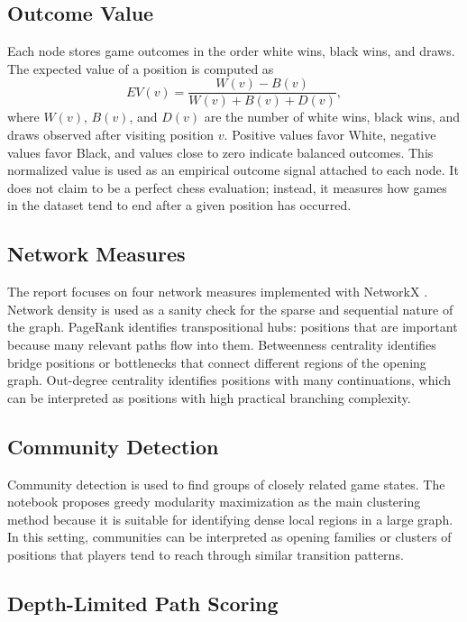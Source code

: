 \documentclass[11pt,a4paper]{article}
\begin{document}
\subsection{Outcome Value}

Each node stores game outcomes in the order white wins, black wins, and draws.
The expected value of a position is computed as
\begin{equation}
  EV(v) = \frac{W(v) - B(v)}{W(v) + B(v) + D(v)},
\end{equation}
where \(W(v)\), \(B(v)\), and \(D(v)\) are the number of white wins, black wins, and draws observed after visiting position \(v\).
Positive values favor White, negative values favor Black, and values close to zero indicate balanced outcomes.
This normalized value is used as an empirical outcome signal attached to each node.
It does not claim to be a perfect chess evaluation; instead, it measures how games in the dataset tend to end after a given position has occurred.

\subsection{Network Measures}

The report focuses on four network measures implemented with NetworkX \citep{networkx}.
Network density is used as a sanity check for the sparse and sequential nature of the graph.
PageRank identifies transpositional hubs: positions that are important because many relevant paths flow into them.
Betweenness centrality identifies bridge positions or bottlenecks that connect different regions of the opening graph.
Out-degree centrality identifies positions with many continuations, which can be interpreted as positions with high practical branching complexity.

\subsection{Community Detection}

Community detection is used to find groups of closely related game states.
The notebook proposes greedy modularity maximization as the main clustering method because it is suitable for identifying dense local regions in a large graph.
In this setting, communities can be interpreted as opening families or clusters of positions that players tend to reach through similar transition patterns.

\subsection{Depth-Limited Path Scoring}
\end{document}
